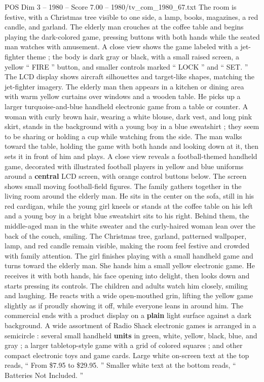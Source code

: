 \begin{textsample}{POS Dim 3 – 1980 – Score 7.00 – 1980/tv\_com\_1980\_67.txt}
The room is festive, with a Christmas tree visible to one side, a lamp, books, magazines, a red candle, and garland.
The elderly man crouches at the coffee table and begins playing the dark-colored game, pressing buttons with both hands while the seated man watches with amusement.
A close view shows the game labeled with a jet-fighter theme ; the body is dark gray or black, with a small raised screen, a yellow “ FIRE ” button, and smaller controls marked “ LOCK ” and “ SET. ” The LCD display shows aircraft silhouettes and target-like shapes, matching the jet-fighter imagery.
The elderly man then appears in a kitchen or dining area with warm yellow curtains over windows and a wooden table.
He picks up a larger turquoise-and-blue handheld electronic game from a table or counter.
A woman with curly brown hair, wearing a white blouse, dark vest, and long pink skirt, stands in the background with a young boy in a blue sweatshirt ; they seem to be sharing or holding a cup while watching from the side.
The man walks toward the table, holding the game with both hands and looking down at it, then sets it in front of him and plays.
A close view reveals a football-themed handheld game, decorated with illustrated football players in yellow and blue uniforms around a \textbf{central} LCD screen, with orange control buttons below.
The screen shows small moving football-field figures.
The family gathers together in the living room around the elderly man.
He sits in the center on the sofa, still in his red cardigan, while the young girl kneels or stands at the coffee table on his left and a young boy in a bright blue sweatshirt sits to his right.
Behind them, the middle-aged man in the white sweater and the curly-haired woman lean over the back of the couch, smiling.
The Christmas tree, garland, patterned wallpaper, lamp, and red candle remain visible, making the room feel festive and crowded with family attention.
The girl finishes playing with a small handheld game and turns toward the elderly man.
She hands him a small yellow electronic game.
He receives it with both hands, his face opening into delight, then looks down and starts pressing its controls.
The children and adults watch him closely, smiling and laughing.
He reacts with a wide open-mouthed grin, lifting the yellow game slightly as if proudly showing it off, while everyone leans in around him.
The commercial ends with a product display on a \textbf{plain} light surface against a dark background.
A wide assortment of Radio Shack electronic games is arranged in a semicircle : several small handheld \textbf{units} in green, white, yellow, black, blue, and gray ; a larger tabletop-style game with a grid of colored squares ; and other compact electronic toys and game cards.
Large white on-screen text at the top reads, “ From \$7.95 to \$29.95. ” Smaller white text at the bottom reads, “ Batteries Not Included. ”

\end{textsample}
